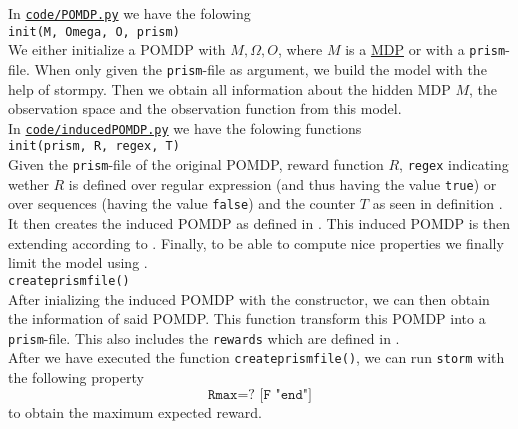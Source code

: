 \label{s:induced_implementation}
In \href{https://gitlab.science.ru.nl/srietbergen/thesis/-/blob/master/code/POMDP.py}{\texttt{code/POMDP.py}} we have the folowing\\

\texttt{\textunderscore\textunderscore init\textunderscore\textunderscore (M, Omega, O, prism)}\\
We either initialize a POMDP with $M, \Omega, O$, where $M$ is a \href{https://gitlab.science.ru.nl/srietbergen/thesis/-/blob/master/code/MDP.py}{MDP} or with a \texttt{prism}-file. When only given the \texttt{prism}-file as argument, we build the model with the help of stormpy\cite{g:stormpy}. Then we obtain all information about the hidden MDP $M$, the observation space and the observation function from this model. \\

In \href{https://gitlab.science.ru.nl/srietbergen/thesis/-/blob/master/code/induced_POMDP.py}{\texttt{code/induced\textunderscore POMDP.py}} we have the folowing functions \\

\texttt{\textunderscore\textunderscore init\textunderscore\textunderscore (prism, R, regex, T)}\\
Given the \texttt{prism}-file of the original POMDP, reward function $R$, \texttt{regex} indicating wether $R$ is defined over regular expression (and thus having the value \texttt{true}) or over sequences (having the value \texttt{false}) and the counter $T$ as seen in definition . It then creates the induced POMDP as defined in . This induced POMDP is then extending according to . Finally, to be able to compute nice properties we finally limit the model using .\\

\texttt{create\textunderscore prism\textunderscore file()}\\
After inializing the induced POMDP with the constructor, we can then obtain the information of said POMDP. This function transform this POMDP into a \texttt{prism}-file. This also includes the \texttt{rewards} which are defined in . \\


After we have executed the function \texttt{create\textunderscore prism\textunderscore file()}, we can run \texttt{storm} with the following property
\[ \texttt{Rmax=? [F "end"]} \]
to obtain the maximum expected reward. 